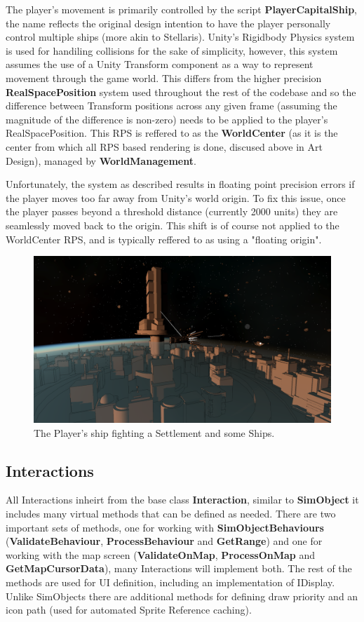\documentclass{report}
\begin{document}
The player's movement is primarily controlled by the script \textbf{PlayerCapitalShip}, the name reflects the original design intention to have the player personally control multiple ships (more akin to Stellaris). Unity's Rigidbody Physics system is used for handiling collisions for the sake of simplicity, however, this system assumes the use of a Unity Transform component as a way to represent movement through the game world. This differs from the higher precision \textbf{RealSpacePosition} system used throughout the rest of the codebase and so the difference between Transform positions across any given frame (assuming the magnitude of the difference is non-zero) needs to be applied to the player's RealSpacePosition. This RPS is reffered to as the \textbf{WorldCenter} (as it is the center from which all RPS based rendering is done, discused above in Art Design), managed by \textbf{WorldManagement}.

Unfortunately, the system as described results in floating point precision errors if the player moves too far away from Unity's world origin. To fix this issue, once the player passes beyond a threshold distance (currently 2000 units) they are seamlessly moved back to the origin. This shift is of course not applied to the WorldCenter RPS, and is typically reffered to as using a "floating origin".

\begin{figure}[H]
	\centering
    \includegraphics[width=.9\textwidth]{playerGameplayExample.png}
    \caption{The Player's ship fighting a Settlement and some Ships.}
\end{figure}

\subsection{Interactions}

All Interactions inheirt from the base class \textbf{Interaction}, similar to \textbf{SimObject} it includes many virtual methods that can be defined as needed. There are two important sets of methods, one for working with \textbf{SimObjectBehaviours} (\textbf{ValidateBehaviour}, \textbf{ProcessBehaviour} and \textbf{GetRange}) and one for working with the map screen (\textbf{ValidateOnMap}, \textbf{ProcessOnMap} and \textbf{GetMapCursorData}), many Interactions will implement both.
The rest of the methods are used for UI definition, including an implementation of IDisplay. Unlike SimObjects there are additional methods for defining draw priority and an icon path (used for automated Sprite Reference caching).
\end{document}

